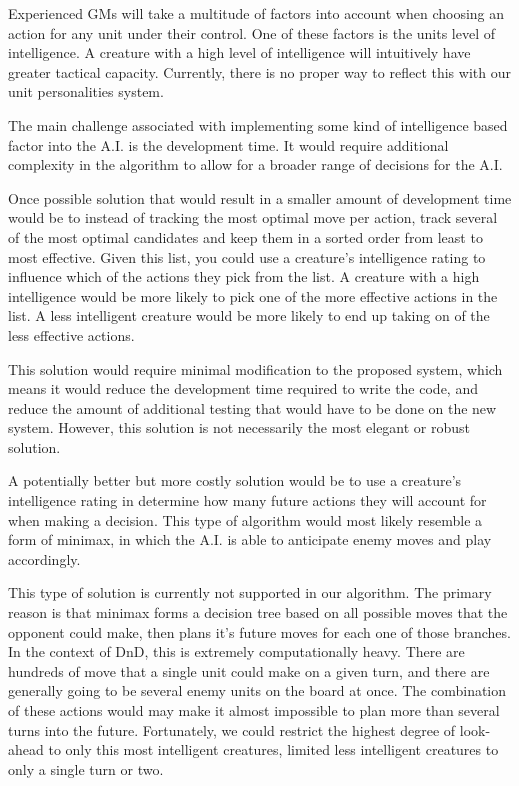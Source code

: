 \documentclass[12pt,a4paper]{report}
\begin{document}
		Experienced GMs will take a multitude of factors into account when choosing an action for any unit under their control. One of these factors is the units level of intelligence. A creature with a high level of intelligence will intuitively have greater tactical capacity. Currently, there is no proper way to reflect this with our unit personalities system. 
		
		The main challenge associated with implementing some kind of intelligence based factor into the A.I. is the development time. It would require additional complexity in the algorithm to allow for a broader range of decisions for the A.I. 
		
		Once possible solution that would result in a smaller amount of development time would be to instead of tracking the most optimal move per action, track several of the most optimal candidates and keep them in a sorted order from least to most effective. Given this list, you could use a creature's intelligence rating to influence which of the actions they pick from the list. A creature with a high intelligence would be more likely to pick one of the more effective actions in the list. A less intelligent creature would be more likely to end up taking on of the less effective actions.
		
		This solution would require minimal modification to the proposed system, which means it would reduce the development time required to write the code, and reduce the amount of additional testing that would have to be done on the new system. However, this solution is not necessarily the most elegant or robust solution. 
		
		
		A potentially better but more costly solution would be to use a creature's intelligence rating in determine how many future actions they will account for when making a decision. This type of algorithm would most likely resemble a form of minimax, in which the A.I. is able to anticipate enemy moves and play accordingly. 
		
		This type of solution is currently not supported in our algorithm. The primary reason is that minimax forms a decision tree based on all possible moves that the opponent could make, then plans it's future moves for each one of those branches. In the context of DnD, this is extremely computationally heavy. There are hundreds of move that a single unit could make on a given turn, and there are generally going to be several enemy units on the board at once. The combination of these actions would may make it almost impossible to plan more than several turns into the future. Fortunately, we could restrict the highest degree of look-ahead to only this most intelligent creatures, limited less intelligent creatures to only a single turn or two. 
		
\end{document}
